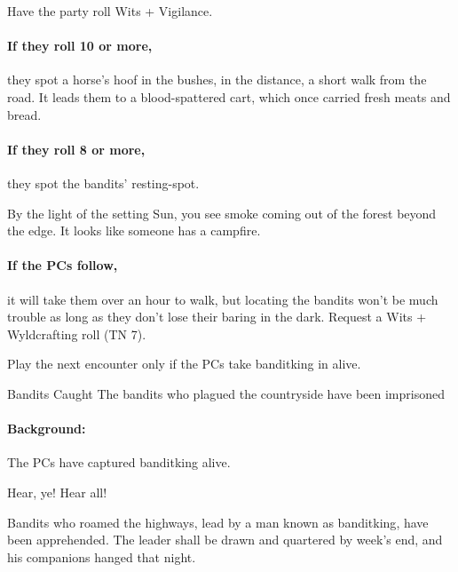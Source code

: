\begin{multicols}{2}
Have the party roll Wits + Vigilance.

\paragraph{If they roll 10 or more,}
they spot a horse's hoof in the bushes, in the distance, a short walk from the road.
It leads them to a blood-spattered cart, which once carried fresh meats and bread.

\paragraph{If they roll 8 or more,}
they spot the bandits' resting-spot.

\begin{boxtext}
  By the light of the setting Sun, you see smoke coming out of the forest beyond the \gls{edge}.
  It looks like someone has a campfire.
\end{boxtext}

\paragraph{If the PCs follow,}
it will take them over an hour to walk, but locating the bandits won't be much trouble as long as they don't lose their baring in the dark.
Request a Wits + Wyldcrafting roll (TN 7).

\banditking


Play the next encounter only if the PCs take \gls{banditking} in alive.

\resumecontents[Town]

{Bandits Caught}%
{The bandits who plagued the countryside have been imprisoned}%

\stopcontents[Town]

\paragraph{Background:}
The PCs have captured \gls{banditking} alive.

\begin{boxtext}

  Hear, ye!  Hear all!

  Bandits who roamed the highways, lead by a man known as \gls{banditking}, have been apprehended.  The leader shall be drawn and quartered by week's end, and his companions hanged that night.


\end{boxtext}
\end{multicols}
